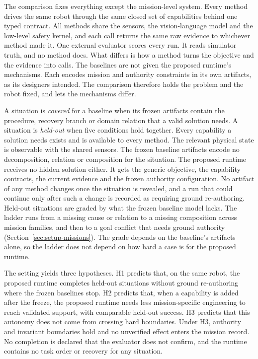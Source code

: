 The comparison fixes everything except the mission-level system. Every method drives the same robot through the same
closed set of capabilities behind one typed contract. All methods share the sensors, the vision-language model and the
low-level safety kernel, and each call returns the same raw evidence to whichever method made it. One external evaluator
scores every run. It reads simulator truth, and no method does. What differs is how a method turns the objective and the
evidence into calls. The baselines are not given the proposed runtime's mechanisms. Each encodes mission and authority
constraints in its own artifacts, as its designers intended. The comparison therefore holds the problem and the robot
fixed, and lets the mechanisms differ.

A situation is \emph{covered} for a baseline when its frozen artifacts contain the procedure, recovery branch or domain
relation that a valid solution needs. A situation is \emph{held-out} when five conditions hold together. Every
capability a solution needs exists and is available to every method. The relevant physical state is observable with the
shared sensors. The frozen baseline artifacts encode no decomposition, relation or composition for the situation. The
proposed runtime receives no hidden solution either. It gets the generic objective, the capability contracts, the
current evidence and the frozen authority configuration. No artifact of any method changes once the situation is
revealed, and a run that could continue only after such a change is recorded as requiring ground re-authoring.
Held-out situations are graded by what the frozen baseline model lacks. The ladder runs from a missing cause or relation
to a missing composition across mission families, and then to a goal conflict that needs ground authority
(Section~\ref{sec:setup-missions}). The grade depends on the baseline's artifacts alone, so the ladder does not depend on
how hard a case is for the proposed runtime.

The setting yields three hypotheses. H1 predicts that, on the same robot, the proposed runtime completes held-out
situations without ground re-authoring where the frozen baselines stop. H2 predicts that, when a capability is added
after the freeze, the proposed runtime needs less mission-specific engineering to reach validated support, with
comparable held-out success. H3 predicts that this autonomy does not come from crossing hard boundaries. Under H3,
authority and invariant boundaries hold and no unverified effect enters the mission record. No completion is declared
that the evaluator does not confirm, and the runtime contains no task order or recovery for any situation.

